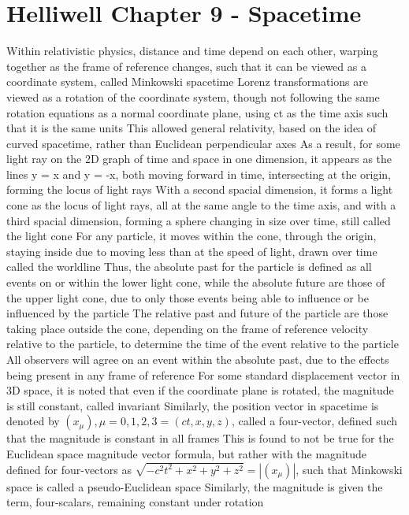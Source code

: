 \documentclass[11 pt, twoside]{article}
\newenvironment{outline*}
{
	\begin{outline}[enumerate]
	}
	{\end{outline}
}
\begin{document}
\section{Helliwell Chapter 9 - Spacetime}
\begin{outline*}
\1 Within relativistic physics, distance and time depend on each other, warping together as the frame of reference changes, such that it can be viewed as a coordinate system, called Minkowski spacetime
\2 Lorenz transformations are viewed as a rotation of the coordinate system, though not following the same rotation equations as a normal coordinate plane, using ct as the time axis such that it is the same units
\2 This allowed general relativity, based on the idea of curved spacetime, rather than Euclidean perpendicular axes
\2 As a result, for some light ray on the 2D graph of time and space in one dimension, it appears as the lines y = x and y = -x, both moving forward in time, intersecting at the origin, forming the locus of light rays
\3 With a second spacial dimension, it forms a light cone as the locus of light rays, all at the same angle to the time axis, and with a third spacial dimension, forming a sphere changing in size over time, still called the light cone
\3 For any particle, it moves within the cone, through the origin, staying inside due to moving less than at the speed of light, drawn over time called the worldline
\1 Thus, the absolute past for the particle is defined as all events on or within the lower light cone, while the absolute future are those of the upper light cone, due to only those events being able to influence or be influenced by the particle
\2 The relative past and future of the particle are those taking place outside the cone, depending on the frame of reference velocity relative to the particle, to determine the time of the event relative to the particle
\2 All observers will agree on an event within the absolute past, due to the effects being present in any frame of reference
\1 For some standard displacement vector in 3D space, it is noted that even if the coordinate plane is rotated, the magnitude is still constant, called invariant
\2 Similarly, the position vector in spacetime is denoted by $(x_\mu), \mu = 0, 1, 2, 3 = (ct, x, y, z)$, called a four-vector, defined such that the magnitude is constant in all frames
\3 This is found to not be true for the Euclidean space magnitude vector formula, but rather with the magnitude defined for four-vectors as $\sqrt{-c^2t^2 + x^2 + y^2 + z^2} = |(x_\mu)|$, such that Minkowski space is called a pseudo-Euclidean space
\4 Similarly, the magnitude is given the term, four-scalars, remaining constant under rotation

\end{outline*}
\end{document}
